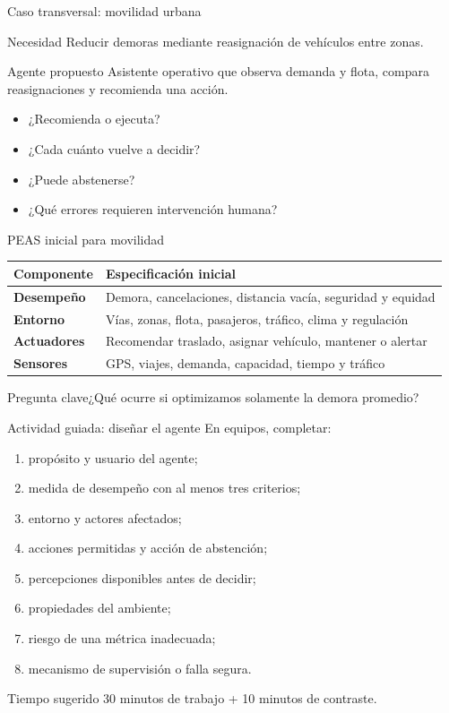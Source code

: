 \documentclass[aspectratio=169,11pt]{beamer}
\newcommand{\pregunta}[1]{\begin{block}{Pregunta clave}#1\end{block}}
\begin{document}
\begin{frame}{Caso transversal: movilidad urbana}
  \begin{block}{Necesidad}
    Reducir demoras mediante reasignación de vehículos entre zonas.
  \end{block}
  \begin{block}{Agente propuesto}
    Asistente operativo que observa demanda y flota, compara reasignaciones y recomienda una acción.
  \end{block}
  \begin{itemize}
    \item ¿Recomienda o ejecuta?
    \item ¿Cada cuánto vuelve a decidir?
    \item ¿Puede abstenerse?
    \item ¿Qué errores requieren intervención humana?
  \end{itemize}
\end{frame}

\begin{frame}{PEAS inicial para movilidad}
  \scriptsize
  \begin{tabularx}{\textwidth}{>{\bfseries}p{} X}
    \toprule
    Componente & Especificación inicial \\
    \midrule
    Desempeño & Demora, cancelaciones, distancia vacía, seguridad y equidad \\
    Entorno & Vías, zonas, flota, pasajeros, tráfico, clima y regulación \\
    Actuadores & Recomendar traslado, asignar vehículo, mantener o alertar \\
    Sensores & GPS, viajes, demanda, capacidad, tiempo y tráfico \\
    \bottomrule
  \end{tabularx}
  \vfill
  \pregunta{¿Qué ocurre si optimizamos solamente la demora promedio?}
\end{frame}

\begin{frame}{Actividad guiada: diseñar el agente}
  \small
  En equipos, completar:
  \begin{enumerate}
    \item propósito y usuario del agente;
    \item medida de desempeño con al menos tres criterios;
    \item entorno y actores afectados;
    \item acciones permitidas y acción de abstención;
    \item percepciones disponibles antes de decidir;
    \item propiedades del ambiente;
    \item riesgo de una métrica inadecuada;
    \item mecanismo de supervisión o falla segura.
  \end{enumerate}
  \begin{block}{Tiempo sugerido}
    30 minutos de trabajo + 10 minutos de contraste.
  \end{block}
\end{frame}
\end{document}
